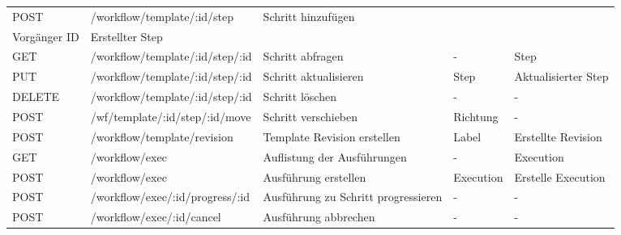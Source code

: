 \begin{small}
\begin{landscape}
\begin{longtable}{l|l|l|l|l}
POST          & /workflow/template/:id/step     & Schritt hinzufügen                  & \begin{tabular}[c]{@{}l@{}}Step\\ Vorgänger ID\end{tabular} & Erstellter Step                                                         \\ \hline
GET           & /workflow/template/:id/step/:id & Schritt abfragen                    & -                                                           & Step                                                                    \\ \hline
PUT           & /workflow/template/:id/step/:id & Schritt aktualisieren               & Step                                                        & Aktualisierter Step                                                     \\ \hline
DELETE        & /workflow/template/:id/step/:id & Schritt löschen                     & -                                                           & -                                                                       \\ \hline
POST          & /wf/template/:id/step/:id/move  & Schritt verschieben                 & Richtung                                                    & -                                                                       \\ \hline
POST          & /workflow/template/revision     & Template Revision erstellen         & Label                                                       & Erstellte Revision                                                      \\ \hline
GET           & /workflow/exec                  & Auflistung der Ausführungen         & -                                                           & Execution                                                               \\ \hline
POST          & /workflow/exec                  & Ausführung erstellen                & Execution                                                   & Erstelle Execution                                                      \\ \hline
POST          & /workflow/exec/:id/progress/:id & Ausführung zu Schritt progressieren & -                                                           & -                                                                       \\ \hline
POST          & /workflow/exec/:id/cancel       & Ausführung abbrechen                & -                                                           & -
\end{longtable}
\end{landscape}
\end{small}

